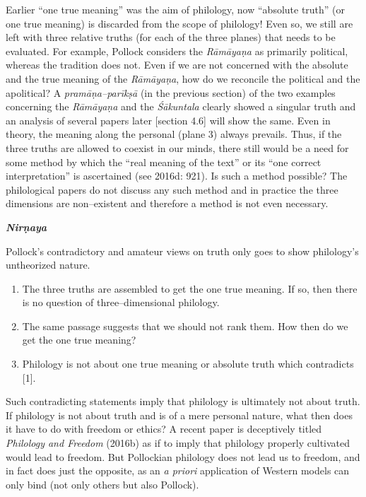 Earlier “one true meaning” was the aim of philology, now “absolute truth” (or one true meaning) is discarded from the scope of philology! Even so, we still are left with three relative truths (for each of the three planes) that needs to be evaluated. For example, Pollock considers the \textit{Rāmāyaṇa} as primarily political, whereas the tradition does not. Even if we are not concerned with the absolute and the true meaning of the \textit{Rāmāyaṇa}, how do we reconcile the political and the apolitical? A \textit{pramāṇa–parīkṣā} (in the previous section) of the two examples concerning the \textit{Rāmāyaṇa} and the \textit{Śākuntala }clearly showed a singular truth and an analysis of several papers later [section 4.6] will show the same. Even in theory, the meaning along the personal (plane 3) always prevails. Thus, if the three truths are allowed to coexist in our minds, there still would be a need for some method by which the “real meaning of the text” or its “one correct interpretation” is ascertained (see 2016d: 921). Is such a method possible? The philological papers do not discuss any such method and in practice the three dimensions are non–existent and therefore a method is not even necessary.

\textit{\textbf{Nirṇaya}}

Pollock’s contradictory and amateur views on truth only goes to show philology’s untheorized nature.

\begin{enumerate}
\itemsep=0pt
\item The three truths are assembled to get the one true meaning. If so, then there is no question of three–dimensional philology.

 \item The same passage suggests that we should not rank them. How then do we get the one true meaning?

 \item Philology is not about one true meaning or absolute truth which contradicts [1].

\end{enumerate}

Such contradicting statements imply that philology is ultimately not about truth. If philology is not about truth and is of a mere personal nature, what then does it have to do with freedom or ethics? A recent paper is deceptively titled \textit{Philology and Freedom} (2016b) as if to imply that philology properly cultivated would lead to freedom. But Pollockian philology does not lead us to freedom, and in fact does just the opposite, as an \textit{a priori} application of Western models can only bind (not only others but also Pollock).

